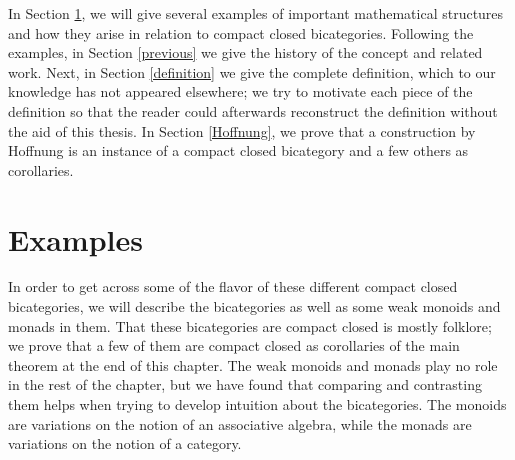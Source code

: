 \documentclass[12pt,twoside,openright]{report}
\begin{document}
In Section \ref{examples}, we will give several examples of important mathematical structures and how they arise in relation to compact closed bicategories.  Following the examples, in Section \ref{previous} we give the history of the concept and related work.  Next, in Section \ref{definition} we give the complete definition, which to our knowledge has not appeared elsewhere; we try to motivate each piece of the definition so that the reader could afterwards reconstruct the definition without the aid of this thesis.  In Section \ref{Hoffnung}, we prove that a construction by Hoffnung is an instance of a compact closed bicategory and a few others as corollaries.

\section{Examples}
\label{examples}

In order to get across some of the flavor of these different compact closed bicategories, we will describe the bicategories as well as some weak monoids and monads in them.  That these bicategories are compact closed is mostly folklore; we prove that a few of them are compact closed as corollaries of the main theorem at the end of this chapter.  The weak monoids and monads play no role in the rest of the chapter, but we have found that comparing and contrasting them helps when trying to develop intuition about the bicategories.  The monoids are variations on the notion of an associative algebra, while the monads are variations on the notion of a category.
\end{document}
